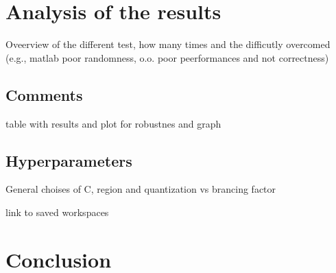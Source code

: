 \documentclass[11pt]{article}
\begin{document}
\pagebreak

\section{Analysis of the results}
Oveerview of the different test, how many times and the difficutly overcomed (e.g., matlab poor randomness, o.o. poor peerformances and not correctness)

\subsection{Comments}
table with results and plot for robustnes and graph

\subsection{Hyperparameters}
General choises of C, region and quantization vs brancing factor

link to saved workspaces

\section{Conclusion}
\end{document}
